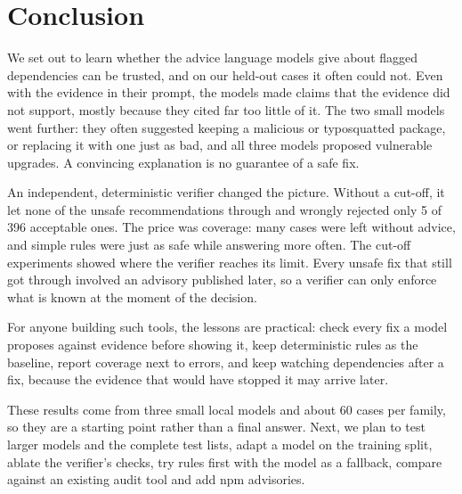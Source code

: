 \documentclass[conference]{IEEEtran}
\begin{document}
\section{Conclusion}
We set out to learn whether the advice language models give about flagged dependencies can be trusted, and on our
held-out cases it often could not. Even with the evidence in their prompt, the models made claims that the evidence
did not support, mostly because they cited far too little of it. The two small models went further: they often
suggested keeping a malicious or typosquatted package, or replacing it with one just as bad, and all three models
proposed vulnerable upgrades. A convincing explanation is no guarantee of a safe fix.

An independent, deterministic verifier changed the picture. Without a cut-off, it let none of the unsafe
recommendations through and wrongly rejected only 5 of 396 acceptable ones. The price was coverage: many cases were
left without advice, and simple rules were just as safe while answering more often. The cut-off experiments showed
where the verifier reaches its limit. Every unsafe fix that still got through involved an advisory published later,
so a verifier can only enforce what is known at the moment of the decision.

For anyone building such tools, the lessons are practical: check every fix a model proposes against evidence
before showing it, keep deterministic rules as the baseline, report coverage next to errors, and keep watching
dependencies after a fix, because the evidence that would have stopped it may arrive later.

These results come from three small local models and about 60 cases per family, so they are a starting point rather
than a final answer. Next, we plan to test larger models and the complete test lists, adapt a model on the training
split, ablate the verifier's checks, try rules first with the model as a fallback, compare against an existing audit
tool and add npm advisories.
\end{document}
